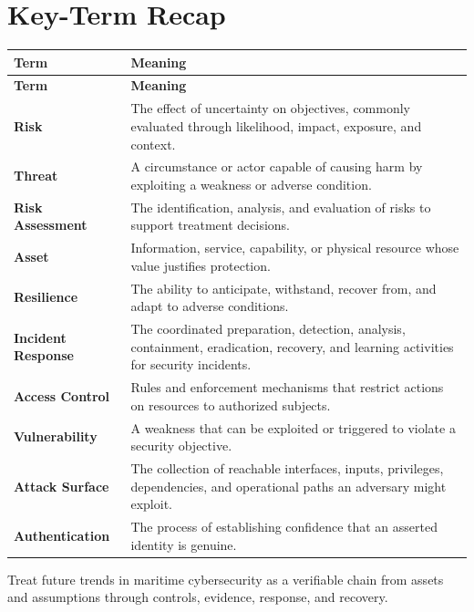 \documentclass[11pt]{article}
\begin{document}
\section*{Key-Term Recap}
\begin{longtable}{>{\RaggedRight\arraybackslash}p{}>{\RaggedRight\arraybackslash}p{}}
\toprule\rowcolor{Navy}\color{white}\textbf{Term} & \color{white}\textbf{Meaning}\\\midrule
\endfirsthead
\toprule\rowcolor{Navy}\color{white}\textbf{Term} & \color{white}\textbf{Meaning}\\\midrule
\endhead
\textbf{Risk} & The effect of uncertainty on objectives, commonly evaluated through likelihood, impact, exposure, and context. \\\midrule
\textbf{Threat} & A circumstance or actor capable of causing harm by exploiting a weakness or adverse condition. \\\midrule
\textbf{Risk Assessment} & The identification, analysis, and evaluation of risks to support treatment decisions. \\\midrule
\textbf{Asset} & Information, service, capability, or physical resource whose value justifies protection. \\\midrule
\textbf{Resilience} & The ability to anticipate, withstand, recover from, and adapt to adverse conditions. \\\midrule
\textbf{Incident Response} & The coordinated preparation, detection, analysis, containment, eradication, recovery, and learning activities for security incidents. \\\midrule
\textbf{Access Control} & Rules and enforcement mechanisms that restrict actions on resources to authorized subjects. \\\midrule
\textbf{Vulnerability} & A weakness that can be exploited or triggered to violate a security objective. \\\midrule
\textbf{Attack Surface} & The collection of reachable interfaces, inputs, privileges, dependencies, and operational paths an adversary might exploit. \\\midrule
\textbf{Authentication} & The process of establishing confidence that an asserted identity is genuine. \\\midrule
\bottomrule
\end{longtable}
\begin{takeawaybox}
Treat future trends in maritime cybersecurity as a verifiable chain from assets and assumptions through controls, evidence, response, and recovery.
\end{takeawaybox}
\end{document}
